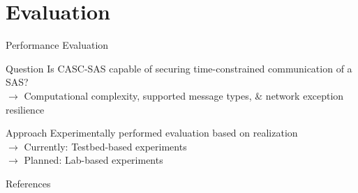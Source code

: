 \documentclass[en]{sdqbeamer}
\begin{document}
\section{Evaluation}
\begin{frame}{Performance Evaluation}
    \begin{greenblock}{Question}
        Is CASC-SAS capable of securing time-constrained communication of a SAS?
        \\$\rightarrow$ Computational complexity, supported message types, \& network exception resilience
    \end{greenblock}
    \begin{blueblock}{Approach}
        Experimentally performed evaluation based on realization
        \\$\rightarrow$ Currently: Testbed-based experiments
        \\$\rightarrow$ Planned: Lab-based experiments
    \end{blueblock}
\end{frame}

\begin{frame}[allowframebreaks]{References}
\printbibliography
\end{frame}

\backupend
\end{document}
